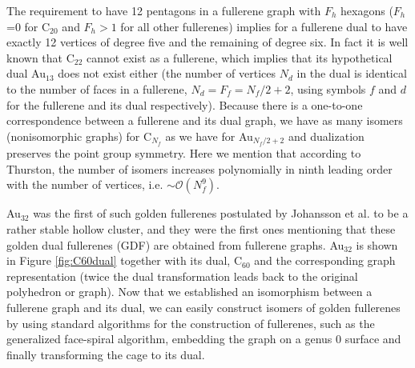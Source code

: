 The requirement to have 12 pentagons in a fullerene graph with $F_h$ hexagons ($F_h$=0 for C$_{20}$ and $F_h > 1$ for all other fullerenes) implies for a fullerene dual to have exactly 12 vertices of degree five and the remaining of degree six. In fact it is well known that C$_{22}$ cannot exist as a fullerene,\autocite{Grunbaum_numberhexagonssimplicity_1963} which implies that its hypothetical dual Au$_{13}$ does not exist either (the number of vertices $N_d$ in the dual is identical to the number of faces in a fullerene, $N_d=F_f=N_f/2+2$,\autocite{Schwerdtfeger_topologyfullerenes_2015} using symbols $f$ and $d$ for the fullerene and its dual respectively). Because there is a one-to-one correspondence between a fullerene and its dual graph, we have as many isomers (nonisomorphic graphs) for C$_{N_f}$ as we have for Au$_{N_f/2+2}$ and dualization preserves the point group symmetry. Here we mention that according to Thurston, the number of isomers increases polynomially in ninth leading order with the number of vertices, i.e. $\sim\mathcal{O}({N_f^9})$.\autocite{Thurston_Shapespolyhedratriangulations_1998} 

Au$_{32}$ was the first of such golden fullerenes postulated by Johansson et al. to be a rather stable hollow cluster, and they were the first ones mentioning that these golden dual fullerenes (GDF) are obtained from fullerene graphs.\autocite{Johansson_Au3224CaratGolden_2004} Au$_{32}$ is shown in Figure \ref{fig:C60dual} together with its dual, C$_{60}$ and the corresponding graph representation (twice the dual transformation leads back to the original polyhedron or graph). Now that we established an isomorphism between a fullerene graph and its dual, we can easily construct isomers of golden fullerenes by using standard algorithms for the construction of fullerenes, such as the generalized face-spiral algorithm,\autocite{Fowler-atlas-2006,Schwerdtfeger_Programfullerenesoftware_2013,Wirz-2014,Schwerdtfeger_topologyfullerenes_2015} embedding the graph on a genus 0 surface and finally transforming the cage to its dual.


